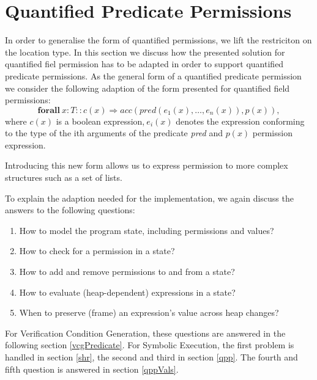 \documentclass[12pt]{article}
\begin{document}
\section{Quantified Predicate Permissions}
\label{qp}
In order to generalise the form of quantified permissions, we lift the restriciton on the location type. In this section we discuss how the presented solution for quantified fiel permission has to be adapted in order to support quantified predicate permissions. 
As the general form of a quantified predicate permission we consider the following adaption of the form presented for quantified field permissions: 
\begin{equation}
 \mathbf{forall} \   x:T :: c(x) \Rightarrow acc(pred(e_1 (x),…,e_n (x)), p(x)), 
\end{equation}
where \(c(x)\) is a boolean expression,\(\ e_i(x)\) denotes the expression conforming to the type of the ith arguments of the predicate \textit{pred} and \(p(x)\) permission expression.

Introducing this new form allows us to express permission to more complex structures such as a set of lists.

To explain the adaption needed for the implementation, we again discuss the answers to the following questions:
\begin{enumerate}
\item How to model the program state, including permissions and values?
\item How to check for a permission in a state?
\item How to add and remove permissions to and from a state?
\item How to evaluate (heap-dependent) expressions in a state?
\item When to preserve (frame) an expression's value across heap changes?
\end{enumerate}

For Verification Condition Generation, these questions are answered in the following section \ref{vcgPredicate}. For Symbolic Execution, the first problem is handled in section \ref{shr}, the second and third in section \ref{qpp}. The fourth and fifth question is answered  in section \ref{qppVals}.
\end{document}
